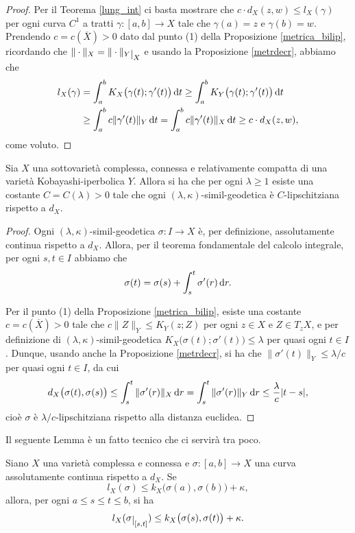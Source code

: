 \begin{proof}
    Per il Teorema \ref{lung_int} ci basta mostrare che $c\cdot d_X(z,w) \le l_X(\gamma)$ per ogni curva $C^1$ a tratti $\gamma:[a,b] \longrightarrow X$ tale che $\gamma(a)=z$ e $\gamma(b)=w$. Prendendo $c=c(\overline{X})>0$ dato dal punto (1) della Proposizione \ref{metrica_bilip}, ricordando che $\|\cdot\|_X=\|\cdot\|_Y\restrict{X}$ e usando la Proposizione \ref{metrdecr}, abbiamo che
    \begin{align*}
        l_X(\gamma)&=\int_a^b K_X\big(\gamma(t);\gamma'(t)\big)\mathop{}\!\mathrm{d} t \ge \int_a^b K_Y\big(\gamma(t);\gamma'(t)\big)\mathop{}\!\mathrm{d} t\\
        &\ge \int_a^b c\|\gamma'(t)\|_Y\mathop{}\!\mathrm{d} t=\int_a^b c\|\gamma'(t)\|_X\mathop{}\!\mathrm{d} t\ge c\cdot d_X(z,w),
    \end{align*}
    come voluto.
\end{proof}

\begin{prop} \label{simillip}
    Sia $X$ una sottovarietà complessa, connessa e relativamente compatta di una varietà Kobayashi-iperbolica $Y$. Allora si ha che per ogni $\lambda \ge 1$ esiste una costante $C=C(\lambda)>0$ tale che ogni $(\lambda,\kappa)$-simil-geodetica è $C$-lipschitziana rispetto a $d_X$.
\end{prop}

\begin{proof}
    Ogni $(\lambda,\kappa)$-simil-geodetica $\sigma:I\longrightarrow X$ è, per definizione, assolutamente continua rispetto a $d_X$. Allora, per il teorema fondamentale del calcolo integrale, per ogni $s,t\in I$ abbiamo che
    $$\sigma(t)=\sigma(s)+\int_s^t\sigma'(r)\mathop{}\!\mathrm{d} r.$$
    
    Per il punto (1) della Proposizione \ref{metrica_bilip}, esiste una costante $c=c(\overline{X})>0$ tale che $c\|Z\|_Y \le K_Y(z;Z)$ per ogni $z\in X$ e $Z\in T_zX$, e per definizione di $(\lambda,\kappa)$-simil-geodetica $K_X\big(\sigma(t);\sigma'(t)\big) \le \lambda$ per quasi ogni $t\in I$. Dunque, usando anche la Proposizione \ref{metrdecr}, si ha che $\|\sigma'(t)\|_Y \le \lambda/c$ per quasi ogni $t\in I$, da cui
    $$d_X\big(\sigma(t),\sigma(s)\big) \le \int_s^t\|\sigma'(r)\|_X\mathop{}\!\mathrm{d} r=\int_s^t\|\sigma'(r)\|_Y\mathop{}\!\mathrm{d} r \le \frac{\lambda}{c}|t-s|,$$
    cioè $\sigma$ è $\lambda/c$-lipschitziana rispetto alla distanza euclidea.
\end{proof}

Il seguente Lemma è un fatto tecnico che ci servirà tra poco.

\begin{lm} \label{restrdis}
    Siano $X$ una varietà complessa e connessa e $\sigma:[a,b] \longrightarrow X$ una curva assolutamente continua rispetto a $d_X$. Se
    $$l_X(\sigma) \le k_X\big(\sigma(a),\sigma(b)\big)+\kappa,$$
    allora, per ogni $a \le s \le t \le b$, si ha
    $$l_X(\sigma\restrict{[s,t]}) \le k_X\big(\sigma(s),\sigma(t)\big)+\kappa.$$
\end{lm}

